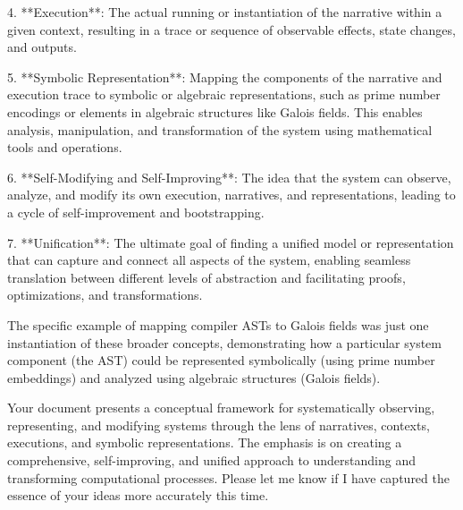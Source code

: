 \documentclass{article}
\begin{document}
4. **Execution**: The actual running or instantiation of the narrative within a given context, resulting in a trace or sequence of observable effects, state changes, and outputs.

5. **Symbolic Representation**: Mapping the components of the narrative and execution trace to symbolic or algebraic representations, such as prime number encodings or elements in algebraic structures like Galois fields. This enables analysis, manipulation, and transformation of the system using mathematical tools and operations.

6. **Self-Modifying and Self-Improving**: The idea that the system can observe, analyze, and modify its own execution, narratives, and representations, leading to a cycle of self-improvement and bootstrapping.

7. **Unification**: The ultimate goal of finding a unified model or representation that can capture and connect all aspects of the system, enabling seamless translation between different levels of abstraction and facilitating proofs, optimizations, and transformations.

The specific example of mapping compiler ASTs to Galois fields was just one instantiation of these broader concepts, demonstrating how a particular system component (the AST) could be represented symbolically (using prime number embeddings) and analyzed using algebraic structures (Galois fields).

Your document presents a conceptual framework for systematically observing, representing, and modifying systems through the lens of narratives, contexts, executions, and symbolic representations. The emphasis is on creating a comprehensive, self-improving, and unified approach to understanding and transforming computational processes. Please let me know if I have captured the essence of your ideas more accurately this time.


 
\end{document}
